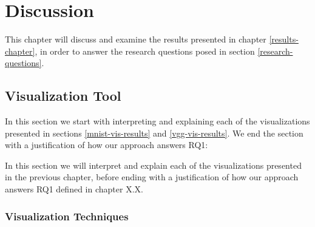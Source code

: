 
\chapter{Discussion} \label{discussion-chapter}

This chapter will discuss and examine the results presented in chapter \ref{results-chapter}, in order to answer the research questions posed in section \ref{research-questions}.


\begin{comment}

RQ 1:How can we develop a visualization tool to improve the understanding of the behaviour of an artificial neural network?

RO 1.1: Examine existing tools in order to uncover shortcomings.
RO 1.2: Identify visualization techniques that can be used to improve the understanding of an artificial neural network.
RO 1.3: Develop a tool that incorporates the techniques found in 1.2 and addresses the shortcomings identified in 1.1.

\end{comment}

\section{Visualization Tool}

In this section we start with interpreting and explaining each of the visualizations presented in sections \ref{mnist-vis-results} and \ref{vgg-vis-results}. We end the section with a justification of how our approach answers RQ1:

In this section we will interpret and explain each of the visualizations presented in the previous chapter, before ending with a justification of how our approach answers RQ1 defined in chapter X.X.




\subsection{Visualization Techniques}


